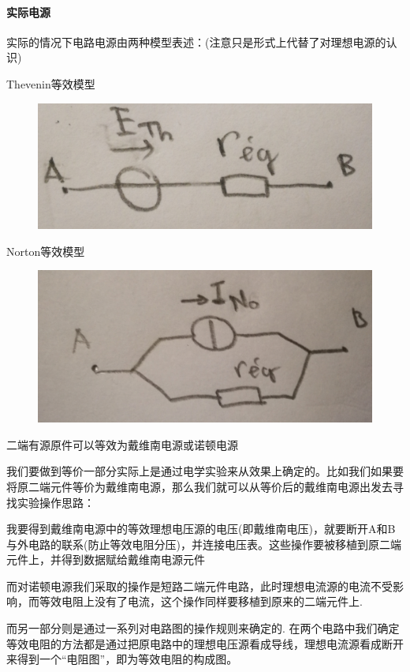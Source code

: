 \documentclass[12pt]{book}
\theoremstyle{definition}\newtheorem{dfn}{Définition}[chapter]
\theoremstyle{plain}\newtheorem{thm}{Théorème}[chapter]
\theoremstyle{plain}\newtheorem{prp}{Proposition}[chapter]
\theoremstyle{plain}\newtheorem{lem}{\bf Lemme}[chapter]
\theoremstyle{plain}\newtheorem{axm}{\bf Axiome}[chapter]
\theoremstyle{plain}\newtheorem{lmm}{\bf Lemme}[chapter]
\theoremstyle{plain}\newtheorem{cor}{\bf Corollaire}[chapter]
\theoremstyle{remark}\newtheorem{rem}{Remarque}[chapter]
\begin{document}
\paragraph{实际电源}实际的情况下电路电源由两种模型表述：(注意只是形式上代替了对理想电源的认识)

Thevenin等效模型
\begin{figure}[H]
	\centering
	\includegraphics[scale=0.1]{image//Electrocinetique cadre et concepts de base//1}
\end{figure}
Norton等效模型
\begin{figure}[H]
	\centering
	\includegraphics[scale=0.1]{image//Electrocinetique cadre et concepts de base//2}
\end{figure}


{\color{red} 二端有源原件可以等效为戴维南电源或诺顿电源} 

我们要做到等价一部分实际上是通过电学实验来从效果上确定的。比如我们如果要将原二端元件等价为戴维南电源，那么我们就可以从等价后的戴维南电源出发去寻找实验操作思路：

我要得到戴维南电源中的等效理想电压源的电压(即戴维南电压)，就要断开A和B与外电路的联系(防止等效电阻分压)，并连接电压表。这些操作要被移植到原二端元件上，并得到数据赋给戴维南电源元件

而对诺顿电源我们采取的操作是短路二端元件电路，此时理想电流源的电流不受影响，而等效电阻上没有了电流，这个操作同样要移植到原来的二端元件上.

而另一部分则是通过一系列对电路图的操作规则来确定的.%
在两个电路中我们确定等效电阻的方法都是通过把原电路中的理想电压源看成导线，理想电流源看成断开来得到一个“电阻图”，即为等效电阻的构成图。
\end{document}
